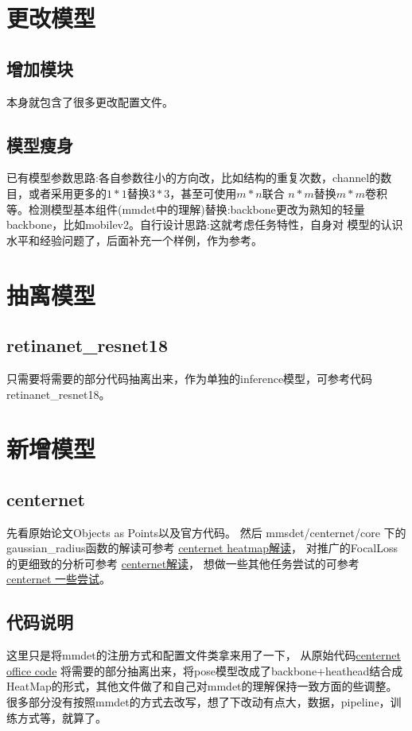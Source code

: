 \documentclass[UTF8]{ctexart}
\begin{document}
\section{更改模型}
\subsection{增加模块}
本身就包含了很多更改配置文件。
\subsection{模型瘦身}
已有模型参数思路:各自参数往小的方向改，比如结构的重复次数，channel的数目，或者采用更多的$1*1$替换$3*3$，甚至可使用$m*n $联合
$n*m$替换$m*m$卷积等。检测模型基本组件(mmdet中的理解)替换:backbone更改为熟知的轻量backbone，比如mobilev2。自行设计思路:这就考虑任务特性，自身对
模型的认识水平和经验问题了，后面补充一个样例，作为参考。


\section{抽离模型}
\subsection{retinanet\_resnet18}
只需要将需要的部分代码抽离出来，作为单独的inference模型，可参考代码retinanet\_resnet18。

\section{新增模型}
\subsection{centernet}
先看原始论文Objects as Points以及官方代码。
然后
mmsdet/centernet/core 下的gaussian\_radius函数的解读可参考
\href{https://zhuanlan.zhihu.com/p/96856635}{centernet heatmap解读}，
对推广的FocalLoss的更细致的分析可参考
\href{https://zhuanlan.zhihu.com/p/66048276}{centernet解读}，
想做一些其他任务尝试的可参考
\href{https://zhuanlan.zhihu.com/p/76378871}{centernet 一些尝试}。

\subsection{代码说明}
这里只是将mmdet的注册方式和配置文件类拿来用了一下，
从原始代码\href{https://github.com/xingyizhou/CenterNet}{centernet office code}
将需要的部分抽离出来，将pose模型改成了backbone+heathead结合成HeatMap的形式，其他文件做了和自己对mmdet的理解保持一致方面的些调整。
很多部分没有按照mmdet的方式去改写，想了下改动有点大，数据，pipeline，训练方式等，就算了。
\end{document}
